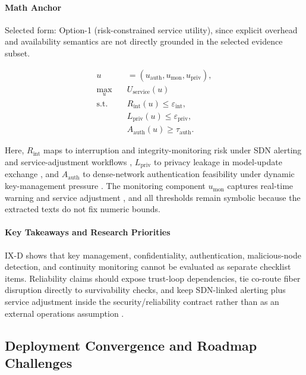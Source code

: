 \documentclass[letterpaper,journal]{IEEEtran}
\begin{document}
\paragraph{Math Anchor}
Selected form: Option-1 (risk-constrained service utility), since explicit overhead and availability semantics are not directly grounded in the selected evidence subset.

\begin{equation}
    \begin{aligned}
        u                 & = (u_{\mathrm{auth}},u_{\mathrm{mon}},u_{\mathrm{priv}}), \\
        \max_{u} \quad    & U_{\mathrm{service}}(u)                                   \\
        \text{s.t.} \quad & R_{\mathrm{int}}(u) \le \varepsilon_{\mathrm{int}},       \\
                          & L_{\mathrm{priv}}(u) \le \varepsilon_{\mathrm{priv}},     \\
                          & A_{\mathrm{auth}}(u) \ge \tau_{\mathrm{auth}}.
    \end{aligned}
\end{equation}

Here, $R_{\mathrm{int}}$ maps to interruption and integrity-monitoring risk under SDN alerting and service-adjustment workflows \cite{O_ISAC_041, O_ISAC_145}, $L_{\mathrm{priv}}$ to privacy leakage in model-update exchange \cite{O_ISAC_039}, and $A_{\mathrm{auth}}$ to dense-network authentication feasibility under dynamic key-management pressure \cite{O_ISAC_156}. The monitoring component $u_{\mathrm{mon}}$ captures real-time warning and service adjustment \cite{O_ISAC_041}, and all thresholds remain symbolic because the extracted texts do not fix numeric bounds.

\paragraph{Key Takeaways and Research Priorities}
IX-D shows that key management, confidentiality, authentication, malicious-node detection, and continuity monitoring cannot be evaluated as separate checklist items. Reliability claims should expose trust-loop dependencies, tie co-route fiber disruption directly to survivability checks, and keep SDN-linked alerting plus service adjustment inside the security/reliability contract rather than as an external operations assumption \cite{O_ISAC_041, O_ISAC_156}.

\subsection{Deployment Convergence and Roadmap Challenges}
\end{document}
